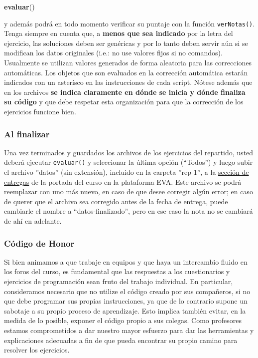 \documentclass[]{article}
\newenvironment{Shaded}{}{}
\newcommand{\KeywordTok}[1]{\textcolor[rgb]{0.00,0.44,0.13}{\textbf{{#1}}}}
\newcommand{\NormalTok}[1]{{#1}}
\begin{document}
\begin{Shaded}
\begin{Highlighting}[]
\KeywordTok{evaluar}\NormalTok{()}
\end{Highlighting}
\end{Shaded}
y además podrá en todo momento verificar su puntaje con la función
\texttt{verNotas()}. Tenga siempre en cuenta que, a \textbf{menos que
sea indicado} por la letra del ejercicio, las soluciones deben ser
genéricas y por lo tanto deben servir aún si se modifican los datos
originales (i.e.: no use valores fijos si no comandos). Usualmente se
utilizan valores generados de forma aleatoria para las correcciones
automáticas. Los objetos que son evaluados en la corrección automática
estarán indicados con un asterísco en las instrucciones de cada script.
Nótese además que en los archivos \textbf{se indica claramente en dónde
se inicia y dónde finaliza su código} y que debe respetar esta
organización para que la corrección de los ejercicios funcione bien.

\subsubsection{Al finalizar}

Una vez terminados y guardados los archivos de los ejercicios del
repartido, usted deberá ejecutar \texttt{evaluar()} y seleccionar la
última opción (``Todos'') y luego subir el archivo ''datos'' (sin
extensión), incluido en la carpeta ''rep-1'', a la
\href{http://eva.universidad.edu.uy/mod/assignment/view.php?id=95125}{sección
de entregas} de la portada del curso en la plataforma EVA. Este archivo
se podrá reemplazar con uno más nuevo, en caso de que desee corregir
algún error; en caso de querer que el archivo sea corregido antes de la
fecha de entrega, puede cambiarle el nombre a ``datos-finalizado'', pero
en ese caso la nota no se cambiará de ahí en adelante.

\subsubsection{Código de Honor}

Si bien animamos a que trabaje en equipos y que haya un intercambio
fluido en los foros del curso, es fundamental que las respuestas a los
cuestionarios y ejercicios de programación sean fruto del trabajo
individual. En particular, consideramos necesario que no utilize el
código creado por sus compañeros, si no que debe programar sus propias
instrucciones, ya que de lo contrario supone un sabotaje a su propio
proceso de aprendizaje. Esto implica también evitar, en la medida de lo
posible, exponer el código propio a sus colegas. Como profesores estamos
comprometidos a dar nuestro mayor esfuerzo para dar las herramientas y
explicaciones adecuadas a fin de que pueda encontrar su propio camino
para resolver los ejercicios.
\end{document}
